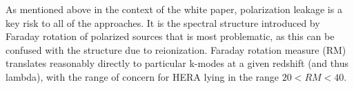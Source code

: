 \documentclass[preprint]{aastex}
\begin{document}
As mentioned above in the context of the white paper, polarization leakage is a key risk to all of the approaches.  
It is the spectral structure introduced by Faraday rotation of polarized sources that is most problematic, as this can be confused with the structure due to reionization.  
Faraday rotation measure (RM) translates reasonably directly to particular k-modes at a given redshift (and thus lambda), with the range of concern for HERA lying in the range $20 < RM < 40$.
% 
% 
\end{document}
